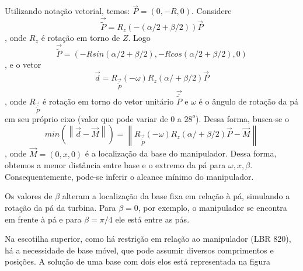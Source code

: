 Utilizando notação vetorial, temos: $\overrightarrow{P} = (0,-R,0)$. Considere
$$\overrightarrow{\widetilde{P}} = R_z(-(\alpha/2 + \beta/2))
\overrightarrow{P}$$, onde $R_z$ é rotação em  torno de $Z$. Logo
$$\overrightarrow{\widetilde{P}} = (-R sin(\alpha/2 + \beta/2),-R cos(\alpha/2 +
\beta/2),0)$$,  e o vetor $$\overrightarrow{d} = R_{\overrightarrow{\overline{\widetilde{P}}}}(-\omega)R_z(\alpha/ +
\beta/2)\overrightarrow{P}$$, onde 
$R_{\overrightarrow{\overline{\widetilde{P}}}}$ é rotação em torno do vetor
unitário $\overrightarrow{\overline{\widetilde{P}}}$ e $\omega$ é o ângulo de
rotação da pá em seu próprio eixo (valor que pode variar de $0$ a $28^o$).
Dessa forma, busca-se o $$min (\left \| \overrightarrow{d} - \overrightarrow{M} 
\right \|) =\left \| R_{\overrightarrow{\overline{\widetilde{P}}}}(-\omega)R_z(\alpha/ +
\beta/2)\overrightarrow{P} - \overrightarrow{M} \right \|$$, onde
$\overrightarrow{M}=(0,x,0)$ é a localização da base do manipulador. Dessa
forma, obtemos a menor distância entre base e o extremo da pá para $\omega,
x, \beta$. Consequentemente, pode-se inferir o alcance mínimo do manipulador.

Os valores de $\beta$ alteram a localização da base fixa em relação à pá,
simulando a rotação da pá da turbina. Para $\beta = 0$, por exemplo, o
manipulador se encontra em frente à pá e para $\beta = \pi/4$ ele está entre as
pás.

Na escotilha superior, como há restrição em relação ao manipulador (LBR 820), há
a necessidade de base móvel, que pode assumir diversos comprimentos e posições.
A solução de uma base com dois elos está representada na figura
